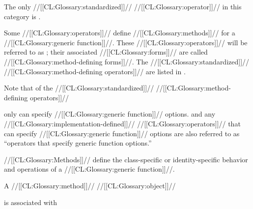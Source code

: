 The only //[[CL:Glossary:standardized]]// //[[CL:Glossary:operator]]// in this category is .








Some //[[CL:Glossary:operators]]// define //[[CL:Glossary:methods]]// for a //[[CL:Glossary:generic function]]//.
These //[[CL:Glossary:operators]]// will be referred to as
;
their associated //[[CL:Glossary:forms]]// are called //[[CL:Glossary:method-defining forms]]//.
The //[[CL:Glossary:standardized]]// //[[CL:Glossary:method-defining operators]]// are listed in \thenextfigure.



















Note that of the //[[CL:Glossary:standardized]]// //[[CL:Glossary:method-defining operators]]//






only 
can specify //[[CL:Glossary:generic function]]// options.
 and any //[[CL:Glossary:implementation-defined]]// //[[CL:Glossary:operators]]//
that can specify //[[CL:Glossary:generic function]]// options
are also referred to as ``operators that specify generic function options.''

\endSubsection%


//[[CL:Glossary:Methods]]// define the class-specific or identity-specific behavior
and operations of a //[[CL:Glossary:generic function]]//. 



A //[[CL:Glossary:method]]// //[[CL:Glossary:object]]// 

is associated with 

